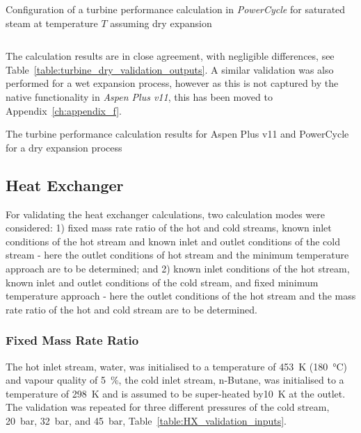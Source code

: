         \begin{listing}[H]
            \caption{Configuration of a turbine performance calculation in \emph{PowerCycle} for saturated steam at temperature \(T\) assuming dry expansion}
            \inputminted[bgcolor=bg,linenos, fontsize=\footnotesize]{python}{Content/PowerCycle/Code/TurbineDryPerf_snippet.py}
            \label{lst:PC_turbine_dry_validation}
            \vspace{-20pt}
        \end{listing}

        The calculation results are in close agreement, with negligible differences, see Table~\ref{table:turbine_dry_validation_outputs}. A similar validation was also performed for a wet expansion process, however as this is not captured by the native functionality in \emph{Aspen Plus v11}, this has been moved to Appendix~\ref{ch:appendix_f}.

        \begin{table}[H]
            \caption{The turbine performance calculation results for Aspen Plus v11 and PowerCycle for a dry expansion process}
            \centering 
            \label{table:turbine_dry_validation_outputs}
                    
        \end{table}

    \subsection{Heat Exchanger}
        For validating the heat exchanger calculations, two calculation modes were considered: 1) fixed mass rate ratio of the hot and cold streams, known inlet conditions of the hot stream and known inlet and outlet conditions of the cold stream - here the outlet conditions of hot stream and the minimum temperature approach are to be determined; and 2) known inlet conditions of the hot stream, known inlet and outlet conditions of the cold stream, and fixed minimum temperature approach - here the outlet conditions of the hot stream and the mass rate ratio of the hot and cold stream are to be determined.

        \subsubsection{Fixed Mass Rate Ratio}
            The hot inlet stream, water, was initialised to a temperature of \qty{453}{\K} (\qty{180}{\degreeCelsius}) and vapour quality of \qty{5}{\percent}, the cold inlet stream, n-Butane, was initialised to a temperature of \qty{298}{\K} and is assumed to be super-heated by\qty{10}{\K} at the outlet. The validation was repeated for three different pressures of the cold stream, \qty{20}{\bar}, \qty{32}{\bar}, and \qty{45}{\bar}, Table~\ref{table:HX_validation_inputs}.

